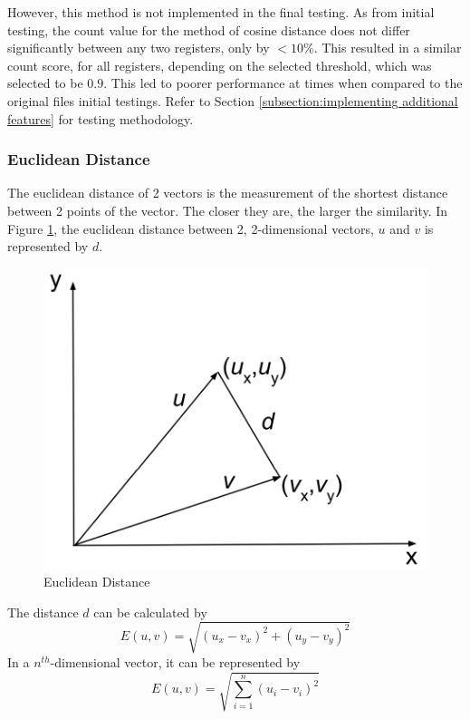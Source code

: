 \documentclass{tum-book}
\begin{document}
            \newpage\noindent
            However, this method is not implemented in the final testing. As from initial testing, the count value for the method of cosine distance does not differ significantly between any two registers, only by $<10\%$. This resulted in a similar count score, for all registers, depending on the selected threshold, which was selected to be $0.9$. This led to poorer performance at times when compared to the original files initial testings. Refer to Section \ref{subsection:implementing additional features} for testing methodology.

        \subsubsection{Euclidean Distance}\label{subsubsection:euclidean distance}
        The euclidean distance of 2 vectors is the measurement of the shortest distance between 2 points of the vector. The closer they are, the larger the similarity. In Figure \ref{fig:Euclidean Distance}, the euclidean distance between 2, 2-dimensional vectors, $u$ and $v$ is represented by $d$.
    
            \begin{figure}[h]
                \centering
                \includegraphics[scale=0.75]{myFiles/myImages/Euclidean_Distance.png}
                \caption{Euclidean Distance}
                \label{fig:Euclidean Distance}
            \end{figure}
    
            \bigskip\noindent
            The distance $d$ can be calculated by 
            \begin{equation}
                \label{eqn:euclidean distance}
                E(u, v)=\sqrt{(u_x - v_x)^2+(u_y-v_y)^2}
            \end{equation}
            \noindent
            In a $n^{th}$-dimensional vector, it can be represented by
            \begin{equation}
                \label{eqn:euclidean distance nth dimension}
            E(u, v)=\sqrt{\sum_{i=1}^{n} {(u_{i} - v_{i})^2}}
            \end{equation}
    
\end{document}
